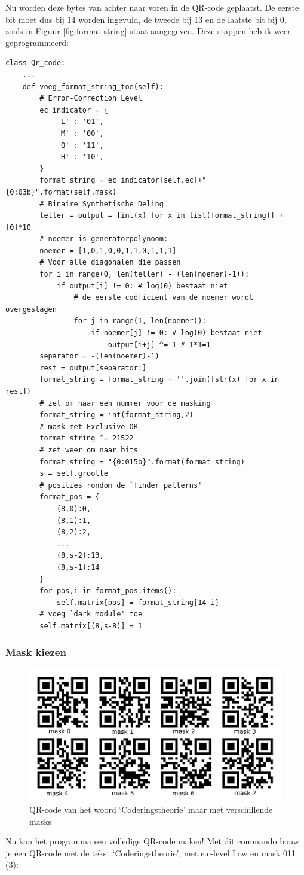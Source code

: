 \documentclass[a4paper]{article}
\begin{document}
Nu worden deze bytes van achter naar voren in de QR-code geplaatst. De eerste bit moet dus bij 14 worden ingevuld, de tweede bij 13 en de laatste bit bij 0, zoals in Figuur \ref{fig:format-string} staat aangegeven. Deze stappen heb ik weer geprogrammeerd:
\begin{verbatim}
class Qr_code:
    ...
    def voeg_format_string_toe(self):
        # Error-Correction Level
        ec_indicator = {
            'L' : '01',
            'M' : '00',
            'Q' : '11',
            'H' : '10',
        }
        format_string = ec_indicator[self.ec]+"{0:03b}".format(self.mask)
        # Binaire Synthetische Deling
        teller = output = [int(x) for x in list(format_string)] + [0]*10
        # noemer is generatorpolynoom:
        noemer = [1,0,1,0,0,1,1,0,1,1,1]
        # Voor alle diagonalen die passen
        for i in range(0, len(teller) - (len(noemer)-1)):
            if output[i] != 0: # log(0) bestaat niet
                # de eerste coöficiënt van de noemer wordt overgeslagen
                for j in range(1, len(noemer)):
                    if noemer[j] != 0: # log(0) bestaat niet
                        output[i+j] ^= 1 # 1*1=1
        separator = -(len(noemer)-1)
        rest = output[separator:]
        format_string = format_string + ''.join([str(x) for x in rest])
        # zet om naar een nummer voor de masking
        format_string = int(format_string,2)
        # mask met Exclusive OR
        format_string ^= 21522
        # zet weer om naar bits
        format_string = "{0:015b}".format(format_string)
        s = self.grootte
        # posities rondom de `finder patterns'
        format_pos = {
            (8,0):0,
            (8,1):1,
            (8,2):2,
            ...
            (8,s-2):13,
            (8,s-1):14
        }
        for pos,i in format_pos.items():
            self.matrix[pos] = format_string[14-i]
        # voeg `dark module' toe
        self.matrix[(8,s-8)] = 1
\end{verbatim}

\subsubsection{Mask kiezen}
\begin{figure}[htbp]
\centering
\includegraphics[width=0.9\linewidth]{masks.png}
\caption{QR-code van het woord `Coderingstheorie' maar met verschillende masks}
\label{fig:masks}
\end{figure}
Nu kan het programma een volledige QR-code maken! Met dit commando bouw je een QR-code met de tekst `Coderingstheorie', met e.c-level Low en mask 011 (3):
\end{document}
